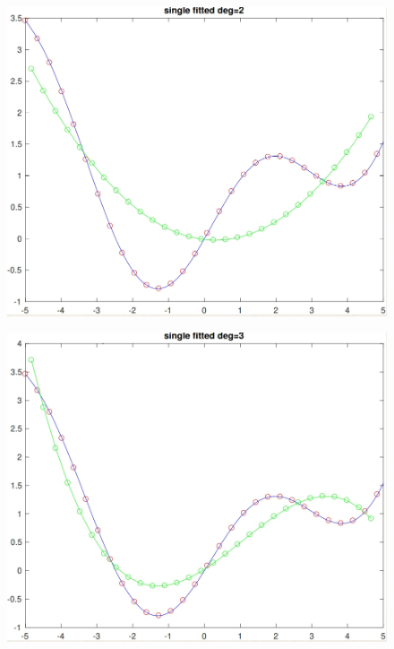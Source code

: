 \begin{figure}[h!]
\centering\includegraphics[scale=0.3]{clean_poly_d_2.png}
\end{figure}

\begin{figure}[h!]
\centering\includegraphics[scale=0.3]{clean_poly_d_3.png}
\end{figure}


